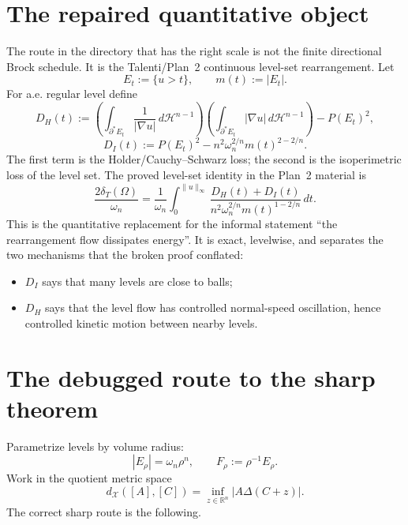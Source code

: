 \documentclass[11pt]{article}
\theoremstyle{definition}
\newcommand{\R}{\mathbb R}
\newcommand{\dT}{\delta_T}
\newcommand{\HH}{\mathcal H}
\newcommand{\X}{\mathcal X}
\begin{document}
\section{The repaired quantitative object}

The route in the directory that has the right scale is not the finite
directional Brock schedule.  It is the Talenti/Plan~2 continuous
level-set rearrangement.  Let
\[
   E_t:=\{u>t\},\qquad m(t):=|E_t|.
\]
For a.e. regular level define
\[
   D_H(t)
   :=
   \left(\int_{\partial^*E_t}\frac{1}{|\nabla u|}\,d\HH^{n-1}\right)
   \left(\int_{\partial^*E_t}|\nabla u|\,d\HH^{n-1}\right)
   -P(E_t)^2,
\]
\[
   D_I(t):=P(E_t)^2-n^2\omega_n^{2/n}m(t)^{2-2/n}.
\]
The first term is the Holder/Cauchy--Schwarz loss; the second is the
isoperimetric loss of the level set.  The proved level-set identity in
the Plan~2 material is
\begin{equation}\label{eq:level-budget}
   \frac{2\dT(\Omega)}{\omega_n}
   =
   \frac{1}{\omega_n}\int_0^{\|u\|_\infty}
   \frac{D_H(t)+D_I(t)}
        {n^2\omega_n^{2/n}m(t)^{1-2/n}}\,dt.
\end{equation}
This is the quantitative replacement for the informal statement
``the rearrangement flow dissipates energy''.  It is exact, levelwise,
and separates the two mechanisms that the broken proof conflated:
\begin{itemize}[leftmargin=2em]
\item \(D_I\) says that many levels are close to balls;
\item \(D_H\) says that the level flow has controlled normal-speed
oscillation, hence controlled kinetic motion between nearby levels.
\end{itemize}

\section{The debugged route to the sharp theorem}

Parametrize levels by volume radius:
\[
   |E_\rho|=\omega_n\rho^n,\qquad
   F_\rho:=\rho^{-1}E_\rho.
\]
Work in the quotient metric space
\[
   d_\X([A],[C])=\inf_{z\in\R^n}|A\Delta(C+z)|.
\]
The correct sharp route is the following.
\end{document}
